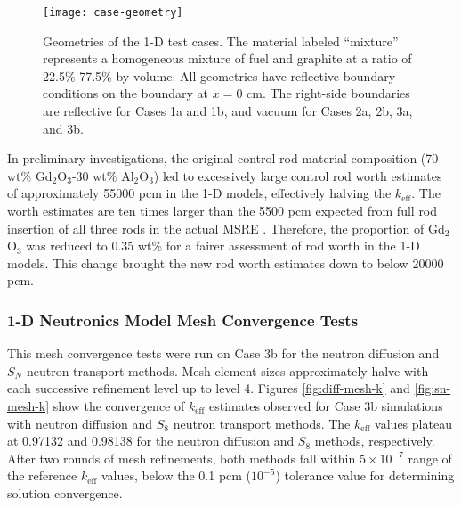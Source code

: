 \begin{figure}[htb!]
  \centering
  \texttt{[image: case-geometry]}
  \caption{Geometries of the 1-D test cases. The material labeled ``mixture'' represents a
    homogeneous mixture of fuel and graphite at a ratio of 22.5\%-77.5\% by volume. All geometries
    have reflective boundary conditions on the boundary at $x=0$ cm. The right-side boundaries are
    reflective for Cases 1a and 1b, and vacuum for Cases 2a, 2b, 3a, and 3b.}
  \label{fig:case-geom}
\end{figure}


In preliminary investigations, the original control rod material composition
(70 wt\% Gd$_2$O$_3$-30 wt\% Al$_2$O$_3$) led to excessively large control rod worth estimates of
approximately 55000 pcm in the 1-D models, effectively halving the $k_\text{eff}$. The worth
estimates are ten times larger
than the 5500 pcm expected from full rod insertion of all three rods in the actual \gls{MSRE}
\cite{fratoni_molten_2020}. Therefore, the proportion of Gd$_2$O$_3$ was reduced to 0.35 wt\% for a
fairer assessment of rod worth in the 1-D models. This change
brought the new rod worth estimates down to below 20000 pcm.

\subsubsection{1-D Neutronics Model Mesh Convergence Tests} \label{sec:1d-mesh-conv}

This mesh convergence tests were run on Case 3b for the neutron diffusion and $S_N$ neutron
transport methods.
Mesh element sizes approximately halve with each successive refinement level up to level 4.
Figures \ref{fig:diff-mesh-k} and \ref{fig:sn-mesh-k} show the convergence of $k_\text{eff}$
estimates observed for Case 3b simulations with neutron diffusion and $S_8$ neutron transport
methods. The $k_\text{eff}$ values plateau at 0.97132 and 0.98138 for the neutron diffusion and
$S_8$ methods, respectively. After two rounds of mesh refinements, both methods fall within
$5\times 10^{-7}$ range of the reference $k_\text{eff}$ values, below the 0.1 pcm ($10^{-5}$)
tolerance value for determining solution convergence.

